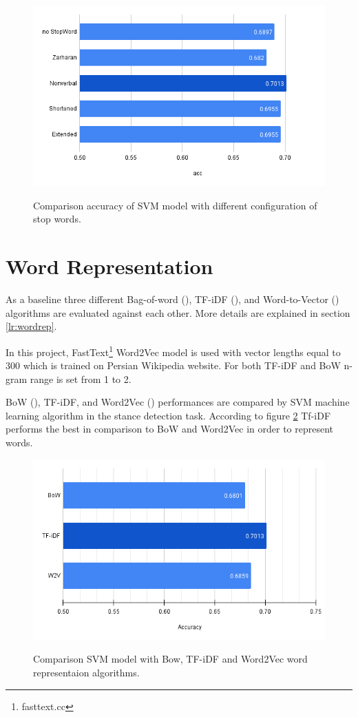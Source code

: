 \begin{figure}%
	\centering
	{\includegraphics[width=12.5cm]{statistics/AccuracyScore.png} }
	\caption{Comparison accuracy of SVM model with different configuration of stop words.}%
	\label{fig:stopwords}%
\end{figure}

\section{Word Representation}
As a baseline three different Bag-of-word (\cite{bow}), TF-iDF (\cite{tfidf}), and Word-to-Vector (\cite{word2vec}) algorithms are evaluated against each other. More details are explained in section \ref{lr:wordrep}.

In this project, FastText\footnote{fasttext.cc} Word2Vec model is used with vector lengths equal to 300 which is trained on Persian Wikipedia website. For both TF-iDF and BoW n-gram range is set from 1 to 2. 

BoW (\cite{bow}), TF-iDF, and Word2Vec (\cite{word2vec}) performances are compared by SVM machine learning algorithm in the stance detection task. According to figure \ref{fig:wordrep} Tf-iDF performs the best in comparison to BoW and Word2Vec in order to represent words.
\begin{figure}%
	\centering
	{\includegraphics[width=12.5cm]{statistics/WordRep.png} }
	\caption{Comparison SVM model with Bow, TF-iDF and Word2Vec word representaion algorithms.}%
	\label{fig:wordrep}%
\end{figure}

